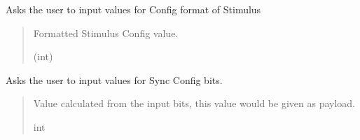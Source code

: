 \documentclass[letterpaper,10pt,english]{sphinxmanual}
\begin{document}
\begin{fulllineitems}
\begin{fulllineitems}
\label{\detokenize{Setup.SetupOneDevice:Setup.SetupOneDevice.Setup_8480SC.Setup8480SC._ChooseStimulusConfig}}
\pysigstartsignatures
{}
\pysigstopsignatures
\sphinxAtStartPar
Asks the user to input values for Config format of Stimulus
\begin{quote}\begin{description}
\sphinxAtStartPar
Formatted Stimulus Config value.

\sphinxAtStartPar
(int)

\end{description}\end{quote}

\end{fulllineitems}


\begin{fulllineitems}
\label{\detokenize{Setup.SetupOneDevice:Setup.SetupOneDevice.Setup_8480SC.Setup8480SC._ChooseSyncConfig}}
\pysigstartsignatures
{}
\pysigstopsignatures
\sphinxAtStartPar
Asks the user to input values for Sync Config bits.
\begin{quote}\begin{description}
\sphinxAtStartPar
Value calculated from the input bits, this value would be given as payload.

\sphinxAtStartPar
int

\end{description}\end{quote}

\end{fulllineitems}



\end{fulllineitems}
\end{document}
